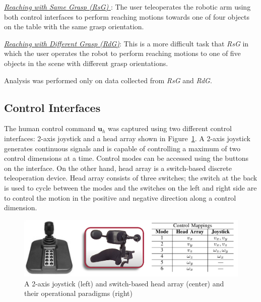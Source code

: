 \documentclass[conference]{IEEEtran}
\begin{document}
\noindent\underline{\textit{Reaching with Same Grasp (RsG)} }: The user teleoperates the robotic arm using both control interfaces to perform reaching motions towards one of four objects on the table with the same grasp orientation.

\noindent\underline{\textit{Reaching with Different Grasp (RdG)}}: This is a more difficult task that \textit{RsG} in which the user operates the robot to perform reaching motions to one of five objects in the scene with different grasp orientations.

Analysis was performed only on data collected from \textit{RsG} and \textit{RdG}.  


\subsection{Control Interfaces}
The human control command $\boldsymbol{u}_h$ was captured using two different control interfaces: 2-axis joystick and a head array shown in Figure~\ref{J2_HA}. 
 A 2-axis joystick generates continuous signals and is capable of controlling a maximum of two control dimensions at a time. Control modes can be accessed using the buttons on the interface. 
On the other hand, head array  is a switch-based discrete teleoperation device. Head array consists of three switches; the switch at the back is used to cycle between the modes and the switches on the left and right side are to control the motion in the positive and negative direction along a control dimension. 
\begin{figure}[h]
	\centering
	\includegraphics[width = 0.9\hsize, height = 0.16\vsize]{./figures/INTER.png}
	\caption{A 2-axis joystick (left) and switch-based head array (center) and their operational paradigms (right)}
	\label{J2_HA}
\end{figure}
\end{document}

